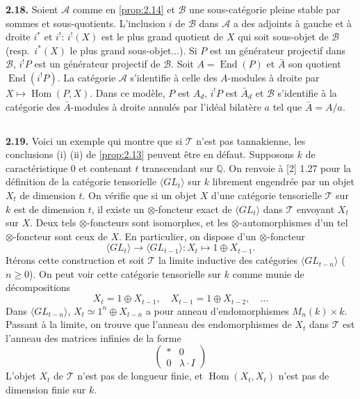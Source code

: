 \documentclass[12pt,a4paper]{article}
\theoremstyle{plain}
\theoremstyle{definition}
\theoremstyle{remark}
\DeclareMathOperator{\Hom}{Hom}
\DeclareMathOperator{\End}{End}
\begin{document}
\textbf{2.18.} Soient $\mathcal{A}$ comme en \ref{prop:2.14} et $\mathcal{B}$ une sous-catégorie pleine stable par sommes et sous-quotients. L'inclusion $i$ de $\mathcal{B}$ dans $\mathcal{A}$ a des adjoints à gauche et à droite $i^*$ et $i^!$: $i^!(X)$ est le plus grand quotient de $X$ qui soit sous-objet de $\mathcal{B}$ (resp.~$i^*(X)$ le plus grand sous-objet...). Si $P$ est un générateur projectif dans $\mathcal{B}$, $i^! P$ est un générateur projectif de $\mathcal{B}$. Soit $A = \End(P)$ et $\bar{A}$ son quotient $\End(i^! P)$. La catégorie $\mathcal{A}$ s'identifie à celle des $A$-modules à droite par $X \mapsto \Hom(P,X)$. Dans ce modèle, $P$ est $A_d$, $i^! P$ est $\bar{A}_d$ et $\mathcal{B}$ s'identifie à la catégorie des $\bar{A}$-modules à droite annulés par l'idéal bilatère $a$ tel que $\bar{A} = A/a$.

\subsection{}

\textbf{2.19.} Voici un exemple qui montre que si $\mathcal{T}$ n'est pas tannakienne, les conclusions (i) (ii) de \ref{prop:2.13} peuvent être en défaut. Supposons $k$ de caractéristique 0 et contenant $t$ transcendant sur $\mathbb{Q}$. On renvoie à [2] 1.27 pour la définition de la catégorie tensorielle $\langle GL_t \rangle$ sur $k$ librement engendrée par un objet $X_t$ de dimension $t$. On vérifie que si un objet $X$ d'une catégorie tensorielle $\mathcal{T}$ sur $k$ est de dimension $t$, il existe un $\otimes$-foncteur exact de $\langle GL_t \rangle$ dans $\mathcal{T}$ envoyant $X_t$ sur $X$. Deux tels $\otimes$-foncteurs sont isomorphes, et les $\otimes$-automorphismes d'un tel $\otimes$-foncteur sont ceux de $X$. En particulier, on dispose d'un $\otimes$-foncteur
\[
\langle GL_t \rangle \longrightarrow \langle GL_{t-1} \rangle : X_t \mapsto 1 \oplus X_{t-1}.
\]
Itérons cette construction et soit $\mathcal{T}$ la limite inductive des catégories $\langle GL_{t-n} \rangle$ ($n \geq 0$). On peut voir cette catégorie tensorielle sur $k$ comme munie de décompositions
\[
X_t = 1 \oplus X_{t-1}, \quad X_{t-1} = 1 \oplus X_{t-2}, \quad \ldots
\]
Dans $\langle GL_{t-n} \rangle$, $X_t \simeq 1^n \oplus X_{t-n}$ a pour anneau d'endomorphismes $M_n(k) \times k$. Passant à la limite, on trouve que l'anneau des endomorphismes de $X_t$ dans $\mathcal{T}$ est l'anneau des matrices infinies de la forme
\[
\begin{pmatrix}
* & 0 \\
0 & \lambda \cdot I
\end{pmatrix}
\]
L'objet $X_t$ de $\mathcal{T}$ n'est pas de longueur finie, et $\Hom(X_t, X_t)$ n'est pas de dimension finie sur $k$.
\end{document}

